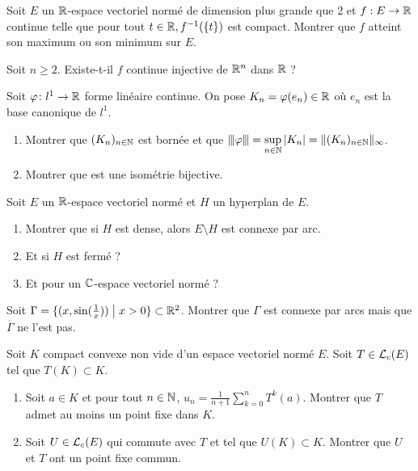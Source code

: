 \begin{exercise}
	Soit $E$ un $\mathbb{R}$-espace vectoriel normé de dimension plus grande que 2 et $f:E\to\mathbb{R}$ continue telle que pour tout $t\in\mathbb{R},f^{-1}(\{t\})$ est compact. Montrer que $f$ atteint son maximum ou son minimum sur $E$.
\end{exercise}

\begin{exercise}
	Soit $n\geqslant2$. Existe-t-il $f$ continue injective de $\mathbb{R}^{n}$ dans $\mathbb{R}$ ?
\end{exercise}

\begin{exercise}
	Soit $\varphi\colon l^{1}\to\mathbb{R}$ forme linéaire continue. On pose $K_{n}=\varphi(e_{n})\in\mathbb{R}$ où $e_{n}$ est la base canonique de $l^{1}$.
	\begin{enumerate}
		\item Montrer que $(K_{n})_{n\in\mathbb{N}}$ est bornée et que ${\left\vert\kern-0.25ex\left\vert\kern-0.25ex\left\vert{}\varphi \right\vert\kern-0.25ex\right\vert\kern-0.25ex\right\vert}=\sup\limits_{n\in\mathbb{N}}\vert K_{n}\vert=\Vert(K_{n})_{n\in\mathbb{N}}\Vert_{\infty}$.
		\item Montrer que 
		est une isométrie bijective.
	\end{enumerate}
\end{exercise}

\begin{exercise}
	Soit $E$ un $\mathbb{R}$-espace vectoriel normé et $H$ un hyperplan de $E$.
	\begin{enumerate}
		\item Montrer que si $H$ est dense, alors $E\setminus H$ est connexe par arc.
		\item Et si $H$ est fermé ?
		\item Et pour un $\mathbb{C}$-espace vectoriel normé ?
	\end{enumerate}
\end{exercise}

\begin{exercise}
	Soit $\Gamma=\{(x,\sin(\frac{1}{x}))\bigm| x>0\}\subset\mathbb{R}^{2}$. Montrer que $\Gamma$ est connexe par arcs mais que $\overline{\Gamma}$ ne l'est pas.
\end{exercise}

\begin{exercise}
	Soit $K$ compact convexe non vide d'un espace vectoriel normé $E$. Soit $T\in\mathcal{L}_{c}(E)$ tel que $T(K)\subset K$.
	\begin{enumerate}
		\item Soit $a\in K$ et pour tout $n\in\mathbb{N}$, $u_{n}=\frac{1}{n+1}\sum_{k=0}^{n}T^{k}(a)$. Montrer que $T$ admet au moins un point fixe dans $K$.
		\item Soit $U\in\mathcal{L}_{c}(E)$ qui commute avec $T$ et tel que $U(K)\subset K$. Montrer que $U$ et $T$ ont un point fixe commun.
	\end{enumerate}
\end{exercise}

